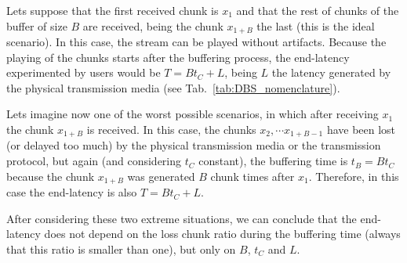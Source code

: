 Lets suppose that the first received chunk is $x_1$ and that the rest
of chunks of the buffer of size $B$ are received, being the chunk
$x_{1+B}$ the last (this is the ideal scenario). In this case, the
stream can be played without artifacts. Because the playing of the
chunks starts after the buffering process, the end-latency
experimented by users would be $T=Bt_C+L$, being $L$ the latency
generated by the physical transmission media (see
Tab.~\ref{tab:DBS_nomenclature}).

Lets imagine now one of the worst possible scenarios, in which after
receiving $x_1$ the chunk $x_{1+B}$ is received. In this case, the
chunks $x_2, \cdots x_{1+B-1}$ have been lost (or delayed too much) by
the physical transmission media or the transmission protocol, but
again (and considering $t_C$ constant), the buffering time is $t_B=Bt_C$
because the chunk $x_{1+B}$ was generated $B$ chunk times after
$x_1$. Therefore, in this case the end-latency is also $T=Bt_C+L$.

After considering these two extreme situations, we can conclude that
the end-latency does not depend on the loss chunk ratio during the
buffering time (always that this ratio is smaller than one), but only
on $B$, $t_C$ and $L$.


\begin{comment}
An heuristic that
works is the described in the Fig.~\ref{fig:DBS_peer_buffering}. As
can be seen, $\text{chunk\_to\_play}$ points to the first received
chunk, that not necessary is the received chunk with lower
index. After that, the
buffering finishes when a chunk with index $\text{chunk\_to\_play} +
\text{BUFFER\_SIZE}/2$ has been received.\footnote{This not means that
  $\text{BUFFER\_SIZE}/2$ chunks are available in the buffer.}
\end{comment}
